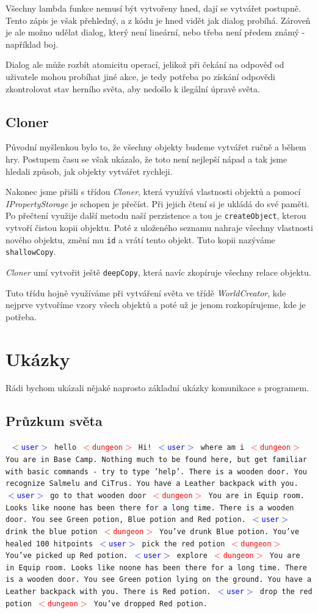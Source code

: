 \documentclass[11pt, a4paper]{article}
\def\class#1{\emph{#1}}
\newenvironment{example}%
{\smallskip\noindent\ignorespaces\obeylines\tt}%
{\smallskip\par\noindent
\ignorespacesafterend}
\def\user{\textcolor{blue}{$<$user$>$ }}
\def\dung{\textcolor{red}{$<$dungeon$>$ }}
\begin{document}
Všechny lambda funkce nemusí být vytvořeny hned, dají se vytvářet postupně. Tento zápis je však přehledný, a z kódu je hned vidět jak dialog probíhá. Zároveň je ale možno udělat dialog, který není lineární, nebo třeba není předem známý - například boj.

Dialog ale může rozbít atomicitu operací, jelikož při čekání na odpověď od uživatele mohou probíhat jiné akce, je tedy potřeba po získání odpovědi zkontrolovat stav herního světa, aby nedošlo k ilegální úpravě světa.

\subsection{Cloner}

Původní myšlenkou bylo to, že všechny objekty budeme vytvářet ručně a během hry. Postupem času se však ukázalo, že toto není nejlepší nápad a tak jsme hledali způsob, jak objekty vytvářet rychleji.

Nakonec jsme přišli s třídou \class{Cloner}, která využívá vlastnosti objektů a pomocí \class{IPropertyStorage} je schopen je přečíst. Při jejich čtení si je ukládá do své paměti. Po přečtení využije další metodu naší perzistence a tou je \texttt{createObject}, kterou vytvoří čistou kopii objektu. Poté z uloženého seznamu nahraje všechny vlastnosti nového objektu, změní mu \texttt{id} a vrátí tento objekt. Tuto kopii nazýváme \texttt{shallowCopy}.

\class{Cloner} umí vytvořit ještě \texttt{deepCopy}, která navíc zkopíruje všechny relace objektu.

Tuto třídu hojně využíváme při vytváření světa ve třídě \class{WorldCreator}, kde nejprve vytvoříme vzory všech objektů a poté už je jenom rozkopírujeme, kde je potřeba.

\section{Ukázky}

Rádi bychom ukázali nějaké naprosto základní ukázky komunikace s programem.
\subsection{Průzkum světa}

\begin{example}
\user hello
\dung Hi!
\user where am i
\dung You are in Base Camp. Nothing much to be found here, but get
familiar with basic commands - try to type 'help'. There is a wooden
door. You recognize Salmelu and CiTrus. You have a Leather backpack 
with you.
\user go to that wooden door
\dung You are in Equip room. Looks like noone has been there for 
a long time. There is a wooden door. You see Green potion, Blue potion 
and Red potion. 
\user drink the blue potion
\dung You've drunk Blue potion. You've healed 100 hitpoints
\user pick the red potion
\dung You've picked up Red potion.
\user explore
\dung You are in Equip room. Looks like noone has been there for 
a long time. There is a wooden door. You see Green potion lying on the 
ground. You have a Leather backpack with you. There is Red potion.
\user drop the red potion
\dung You've dropped Red potion. 
\end{example}
\end{document}
